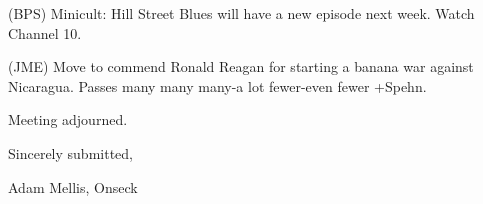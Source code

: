 \documentclass[12pt]{article}
\begin{document}
(BPS) Minicult: Hill Street Blues will have a new episode next week. Watch Channel 10.

(JME) Move to commend Ronald Reagan for starting a banana war against Nicaragua. Passes many many many-a lot fewer-even fewer +Spehn.

\vspace{12pt}

\noindent
Meeting adjourned.

\vspace{18pt}

\centerline{Sincerely submitted,}
\centerline{Adam Mellis, Onseck}
\end{document}
